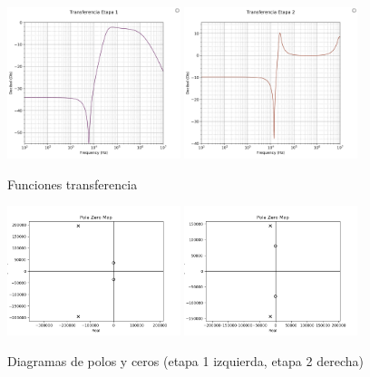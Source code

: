 \begin{figure}[H]
\begin{centering}
\includegraphics[width=0.45\textwidth]{../Ex3/Resources/bodeetapa1.png}
\includegraphics[width=0.45\textwidth]{../Ex3/Resources/bodeetapa2.png}
\par\end{centering}
\caption{Funciones transferencia}
\label{bodeetapas}
\end{figure}

\begin{figure}[H]
\begin{centering}
\includegraphics[width=0.45\textwidth]{../Ex3/Resources/polosetapa1.png}
\includegraphics[width=0.45\textwidth]{../Ex3/Resources/polosetapa2.png}
\par\end{centering}
\caption{Diagramas de polos y ceros (etapa 1 izquierda, etapa 2 derecha)}
\label{polosetapas}
\end{figure}



